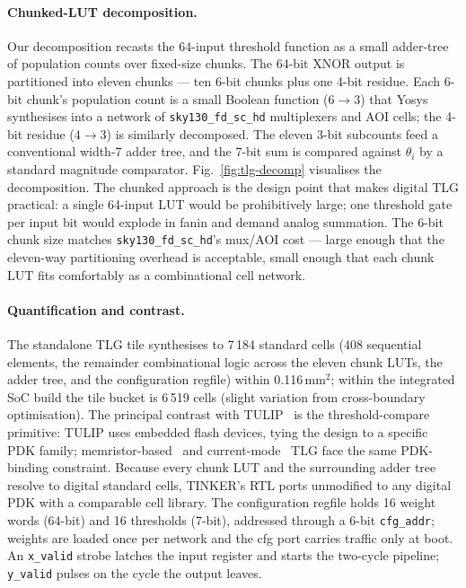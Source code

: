 \documentclass[conference]{IEEEtran}
\begin{document}
\paragraph{Chunked-LUT decomposition.} Our decomposition recasts
the 64-input threshold function as a small adder-tree of population
counts over fixed-size chunks. The 64-bit XNOR output is partitioned
into eleven chunks --- ten 6-bit chunks plus one 4-bit residue.
Each 6-bit chunk's population count is a small Boolean function
($6 \to 3$) that Yosys synthesises into a network of
\texttt{sky130\_fd\_sc\_hd} multiplexers and AOI cells; the 4-bit
residue ($4 \to 3$) is similarly decomposed. The eleven 3-bit
subcounts feed a conventional width-7 adder tree, and the 7-bit
sum is compared against \(\theta_i\) by a standard magnitude
comparator. Fig.~\ref{fig:tlg-decomp} visualises the decomposition.
The chunked approach is the design point that makes digital TLG
practical: a single 64-input LUT would be prohibitively large; one
threshold gate per input bit would explode in fanin and demand
analog summation. The 6-bit chunk size matches
\texttt{sky130\_fd\_sc\_hd}'s mux/AOI cost --- large enough that
the eleven-way partitioning overhead is acceptable, small enough
that each chunk LUT fits comfortably as a combinational cell
network.

\paragraph{Quantification and contrast.} The standalone TLG tile
synthesises to 7\,184 standard cells (408 sequential elements, the
remainder combinational logic across the eleven chunk LUTs, the
adder tree, and the configuration regfile) within 0.116\,mm$^2$;
within the integrated SoC build the tile bucket is 6\,519 cells
(slight variation from cross-boundary optimisation). The principal
contrast with TULIP~\cite{tulip} is the threshold-compare primitive:
TULIP uses embedded flash devices, tying the design to a specific
PDK family; memristor-based~\cite{papandroulidakis2019practical}
and current-mode~\cite{beiu2003differential} TLG face the same
PDK-binding constraint. Because every chunk LUT and the
surrounding adder tree resolve to digital standard cells, TINKER's
RTL ports unmodified to any digital PDK with a comparable cell
library. The configuration regfile holds 16 weight words (64-bit)
and 16 thresholds (7-bit), addressed through a 6-bit
\texttt{cfg\_addr}; weights are loaded once per network and the cfg
port carries traffic only at boot. An \texttt{x\_valid} strobe
latches the input register and starts the two-cycle pipeline;
\texttt{y\_valid} pulses on the cycle the output leaves.
\end{document}
